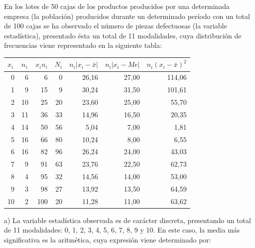 En los lotes de 50 cajas de los productos producidos por una determinada empresa (la población) producidos durante un determinado período con un total de 100 cajas se ha observado el número de piezas defectuosas (la variable estadística), presentado ésta un total de 11 modalidades, cuya distribución de frecuencias viene representado en la siguiente tabla:
\begin{center}
	\begin{table}[htbp]
		\begin{center}
			\begin{tabular}{|r|r|r|r|r|r|r|}
				\hline
				\multicolumn{1}{|l|}{$x_{i}$} & \multicolumn{1}{l|}{$n_{i}$} &
				\multicolumn{1}{l|}{$x_{i}n_{i}$} & \multicolumn{1}{l|}{$N_{i}$} & \multicolumn{1}{l|}{$n_{i}|x_{i} - \bar x|$} & \multicolumn{1}{l|}{$n_{i}|x_{i} - Me|$} & \multicolumn{1}{l|}{$n_{i}(x_{i} - \bar x)^2$} \\ \hline
				0 & 6 & 6 & 0 & 26,16 & 27,00 & 114,06 \\ \hline
				1 & 9 & 15 & 9 & 30,24 & 31,50 & 101,61 \\ \hline
				2 & 10 & 25 & 20 & 23,60 & 25,00 & 55,70 \\ \hline
				3 & 11 & 36 & 33 & 14,96 & 16,50 & 20,35 \\ \hline
				4 & 14 & 50 & 56 & 5,04 & 7,00 & 1,81 \\ \hline
				5 & 16 & 66 & 80 & 10,24 & 8,00 & 6,55 \\ \hline
				6 & 16 & 82 & 96 & 26,24 & 24,00 & 43,03 \\ \hline
				7 & 9 & 91 & 63 & 23,76 & 22,50 & 62,73 \\ \hline
				8 & 4 & 95 & 32 & 14,56 & 14,00 & 53,00 \\ \hline
				9 & 3 & 98 & 27 & 13,92 & 13,50 & 64,59 \\ \hline
				10 & 2 & 100 & 20 & 11,28 & 11,00 & 63,62 \\ \hline
			\end{tabular}
		\end{center}
	\end{table}
	
	
	
	
\end{center}
a) La variable estadística observada es de carácter discreta, presentando un total de 11 modalidades: 0, 1, 2, 3, 4, 5, 6, 7, 8, 9 y 10. En este caso, la media más significativa es la aritmética, cuya expresión viene determinado por:

